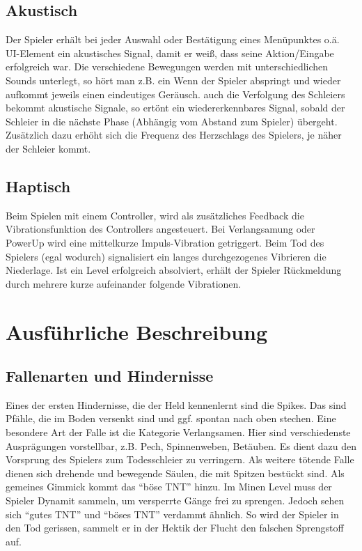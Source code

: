 \documentclass{article}
\begin{document}
\subsection{Akustisch}
Der Spieler erhält bei jeder Auswahl oder Bestätigung eines Menüpunktes o.ä. UI-Element ein akustisches Signal, damit er weiß, dass seine Aktion/Eingabe erfolgreich war. \newline
Die verschiedene Bewegungen werden mit unterschiedlichen Sounds unterlegt, so hört man z.B. ein Wenn der Spieler abspringt und wieder aufkommt jeweils einen eindeutiges Geräusch. \newline
auch die Verfolgung des Schleiers bekommt akustische Signale, so ertönt ein wiedererkennbares Signal, sobald der Schleier in die nächste Phase (Abhängig vom Abstand zum Spieler) übergeht. Zusätzlich dazu erhöht sich die Frequenz des Herzschlags des Spielers, je näher der Schleier kommt.

\subsection{Haptisch}

Beim Spielen mit einem Controller, wird als zusätzliches Feedback die Vibrationsfunktion
des Controllers angesteuert. \newline
Bei Verlangsamung oder PowerUp wird eine mittelkurze Impuls-Vibration getriggert. \newline
Beim Tod des Spielers (egal wodurch) signalisiert ein langes durchgezogenes Vibrieren die
Niederlage. \newline
Ist ein Level erfolgreich absolviert, erhält der Spieler Rückmeldung durch mehrere kurze
aufeinander folgende Vibrationen.

\vspace{1cm}
\section{Ausführliche Beschreibung}

\subsection{Fallenarten und Hindernisse}
Eines der ersten Hindernisse, die der Held kennenlernt sind die Spikes. Das sind Pfähle, die
im Boden versenkt sind und ggf. spontan nach oben stechen. \newline
Eine besondere Art der Falle ist die Kategorie Verlangsamen. Hier sind verschiedenste
Ausprägungen vorstellbar, z.B. Pech, Spinnenweben, Betäuben. Es dient dazu den Vorsprung
des Spielers zum Todesschleier zu verringern. \newline
Als weitere tötende Falle dienen sich drehende und bewegende Säulen, die mit Spitzen bestückt sind. \newline
Als gemeines Gimmick kommt das “böse TNT” hinzu. Im Minen Level
muss der Spieler Dynamit sammeln, um versperrte Gänge frei zu sprengen. Jedoch sehen sich
“gutes TNT” und “böses TNT” verdammt ähnlich. So wird der Spieler in den Tod gerissen,
sammelt er in der Hektik der Flucht den falschen Sprengstoff auf.
\end{document}
